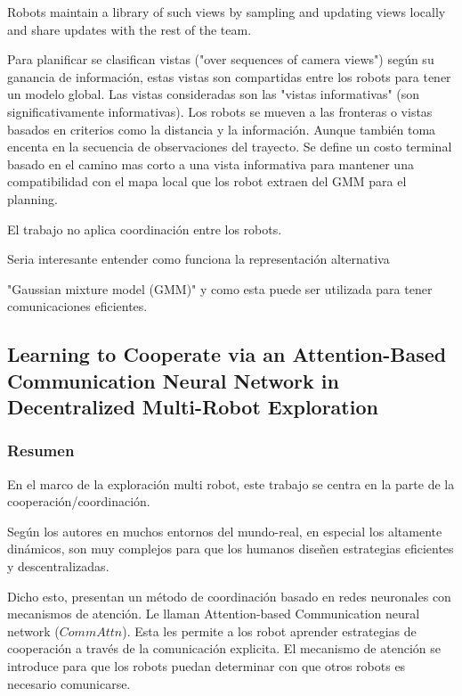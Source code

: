 Robots maintain a library of such views by sampling and updating views locally and share updates with the rest of the team. 

Para planificar se clasifican vistas ("over sequences of camera views") según su ganancia de información, estas vistas son compartidas entre los robots para tener un modelo global. Las vistas consideradas son las "vistas informativas" (son significativamente informativas).
Los robots se mueven a las fronteras o vistas basados en criterios como la distancia y la información. Aunque también toma encenta en la secuencia de observaciones del trayecto.
Se define un costo terminal basado en el camino mas corto a una vista informativa para mantener una compatibilidad con el mapa local que los robot extraen del GMM para el planning.

El trabajo no aplica coordinación entre los robots.

Seria interesante entender como funciona la representación alternativa

"Gaussian mixture model (GMM)" y como esta puede ser utilizada para tener comunicaciones eficientes.

\subsection[Learning to Cooperate via an Attention-Based Communication Neural Network in Decentralized Multi-Robot Exploration]{Learning to Cooperate via an Attention-Based\\ Communication Neural Network in Decentralized Multi-Robot Exploration}

\subsubsection{Resumen}
En el marco de la exploración multi robot, este trabajo se centra en la parte de la cooperación/coordinación. 

Según los autores en muchos entornos del mundo-real, en especial los altamente dinámicos, son muy complejos para que los humanos diseñen estrategias eficientes y descentralizadas.

Dicho esto, presentan un método de coordinación basado en redes neuronales con mecanismos de atención. Le llaman Attention-based Communication neural network ($CommAttn$). Esta les permite a los robot aprender estrategias de cooperación a través de la comunicación explicita. El mecanismo de atención se introduce para que los robots puedan determinar con que otros robots es necesario comunicarse.

